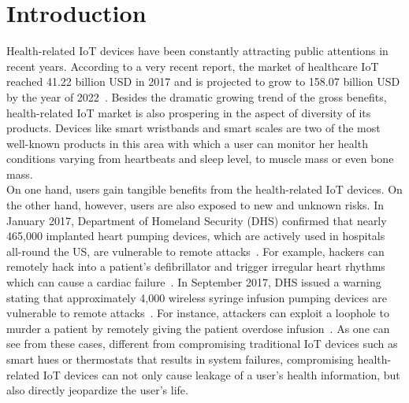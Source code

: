 \section{Introduction}
\label{sec:introduction}
Health-related IoT devices have been constantly attracting public attentions in recent years. According to a very recent report, the market of healthcare IoT reached 41.22 billion USD in 2017 and is projected to grow to 158.07 billion USD by the year of 2022~\cite{healthiotmarket}. Besides the dramatic growing trend of the gross benefits, health-related IoT market is also prospering in the aspect of diversity of its products. Devices like smart wristbands and smart scales are two of the most well-known products in this area with which a user can monitor her health conditions varying from heartbeats and sleep level, to muscle mass or even bone mass.\\
\indent On one hand, users gain tangible benefits from the health-related IoT devices. On the other hand, however, users are also exposed to new and unknown risks. In January 2017, Department of Homeland Security (DHS) confirmed that nearly 465,000 implanted heart pumping devices, which are actively used in hospitals all-round the US, are vulnerable to remote attacks~\cite{heartpump}. For example, hackers can remotely hack into a patient's defibrillator and trigger irregular heart rhythms which can cause a cardiac failure~\cite{heartpump}. In September 2017, DHS issued a warning stating that approximately 4,000 wireless syringe infusion pumping devices are vulnerable to remote attacks~\cite{infusionhack}. For instance, attackers can exploit a loophole to murder a patient by remotely giving the patient overdose infusion~\cite{infusionhack}. As one can see from these cases, different from compromising traditional IoT devices such as smart hues or thermostats that results in system failures, compromising health-related IoT devices can not only cause leakage of a user's health information, but also directly jeopardize the user's life.\\
